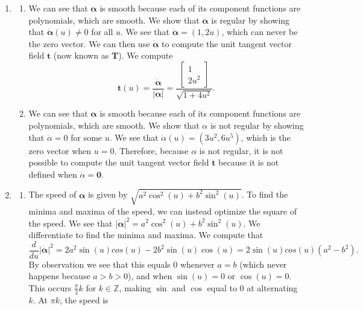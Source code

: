\documentclass[12pt]{article}
\begin{document}
\begin{enumerate}[label=\Alph*.]
    \item \begin{enumerate}[label=\theenumi\Alph*]
        \item We can see that $\bm{\alpha}$ is smooth because each of its component functions are polynomials, which are smooth. We show that $\bm{\alpha}$ is regular by showing that $\bm{\dot{\alpha}}(u)\neq 0$ for all $u$. We see that $\bm{\dot{\alpha}}=(1, 2u)$, which can never be the zero vector. We can then use $\bm{\dot{\alpha}}$ to compute the unit tangent vector field $\mathbf{t}$ (now known as $\mathbf{T}$). We compute
    \begin{equation*}
        \mathbf{t}(u)=\frac{\bm{\dot{\alpha}}}{\vert\bm{\dot{\alpha}}\vert}=\frac{\begin{bmatrix}
            1\\
            2u^2
        \end{bmatrix}}{\sqrt{1+4u^2}}.
    \end{equation*}
    \item We can see that $\bm{\alpha}$ is smooth because each of its component functions are polynomials, which are smooth. We show that $\alpha$ is not regular by showing that $\dot{\alpha}=0$ for some $u$. We see that $\dot{\alpha}(u)=(3u^2, 6u^5)$, which is the zero vector when $u=0$. Therefore, because $\alpha$ is not regular,
    it is not possible to compute the unit tangent vector field $\mathbf{t}$ because it is not defined when $\dot{\alpha}=\mathbf{0}$.
\end{enumerate}
    \item \begin{enumerate}[label=\theenumi\Alph*]
        \item The speed of $\bm{\alpha}$ is given by $\sqrt{a^2\cos^2(u)+b^2\sin^2(u)}$. To find the minima and maxima of the speed, we can instead optimize the square of the speed. We see that ${\vert\bm{\dot{\alpha}}\vert}^2=a^2\cos^2(u)+b^2\sin^2(u)$. We differentiate to find the minima and maxima. We compute that \begin{equation*}
            \frac{d}{du}{\vert\bm{\dot{\alpha}}\vert}^2=2a^2\sin(u)cos(u)-2b^2\sin(u)\cos(u)=2\sin(u)cos(u)(a^2-b^2).
        \end{equation*} By observation we see that this equals 0 whenever $a=b$ (which never happens because $a>b>0$), and when $\sin(u)=0$ or $\cos(u)=0$. This occurs $\frac{\pi}{2}k$ for $k\in \mathbb{Z}$, making $\sin$ and $\cos$ equal to 0 at alternating $k$. At $\pi k$, the speed is \begin{equation*}

\end{equation*}
\end{enumerate}
\end{enumerate}
\end{document}
